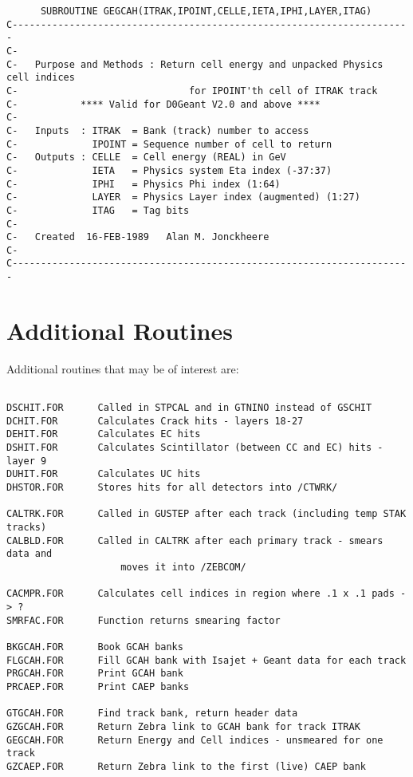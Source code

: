 \begin{verbatim}
      SUBROUTINE GEGCAH(ITRAK,IPOINT,CELLE,IETA,IPHI,LAYER,ITAG)
C----------------------------------------------------------------------
C-
C-   Purpose and Methods : Return cell energy and unpacked Physics cell indices
C-                              for IPOINT'th cell of ITRAK track
C-           **** Valid for D0Geant V2.0 and above ****
C-
C-   Inputs  : ITRAK  = Bank (track) number to access
C-             IPOINT = Sequence number of cell to return
C-   Outputs : CELLE  = Cell energy (REAL) in GeV
C-             IETA   = Physics system Eta index (-37:37)
C-             IPHI   = Physics Phi index (1:64)
C-             LAYER  = Physics Layer index (augmented) (1:27)
C-             ITAG   = Tag bits
C-
C-   Created  16-FEB-1989   Alan M. Jonckheere
C-
C----------------------------------------------------------------------
\end{verbatim}

\newpage
\section{Additional Routines}

Additional routines that may be of interest are:
\begin{verbatim}

DSCHIT.FOR      Called in STPCAL and in GTNINO instead of GSCHIT
DCHIT.FOR       Calculates Crack hits - layers 18-27
DEHIT.FOR       Calculates EC hits
DSHIT.FOR       Calculates Scintillator (between CC and EC) hits - layer 9
DUHIT.FOR       Calculates UC hits
DHSTOR.FOR      Stores hits for all detectors into /CTWRK/

CALTRK.FOR      Called in GUSTEP after each track (including temp STAK tracks)
CALBLD.FOR      Called in CALTRK after each primary track - smears data and
                    moves it into /ZEBCOM/

CACMPR.FOR      Calculates cell indices in region where .1 x .1 pads -> ?
SMRFAC.FOR      Function returns smearing factor

BKGCAH.FOR      Book GCAH banks
FLGCAH.FOR      Fill GCAH bank with Isajet + Geant data for each track
PRGCAH.FOR      Print GCAH bank
PRCAEP.FOR      Print CAEP banks

GTGCAH.FOR      Find track bank, return header data
GZGCAH.FOR      Return Zebra link to GCAH bank for track ITRAK
GEGCAH.FOR      Return Energy and Cell indices - unsmeared for one track
GZCAEP.FOR      Return Zebra link to the first (live) CAEP bank

\end{verbatim}
\newpage

